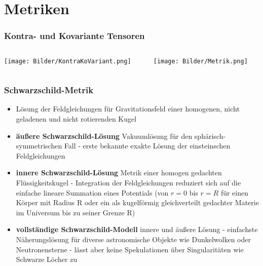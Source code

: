 \documentclass{beamer}
\begin{document}
\section{Metriken}

\begin{frame}\frametitle{Kontra- und Kovariante Tensoren}

\begin{columns}

\begin{column}{.48\textwidth}

\texttt{[image: Bilder/KontraKoVariant.png]}

\end{column}

\hfill

\begin{column}{.48\textwidth}

\texttt{[image: Bilder/Metrik.png]}

\end{column}

\end{columns}

\end{frame}

\begin{frame}\frametitle{Schwarzschild-Metrik}

\begin{itemize}

\item Lösung der Feldgleichungen für Gravitationsfeld einer homogenen, nicht geladenen und nicht rotierenden Kugel

\item \textbf{äußere Schwarzschild-Lösung} Vakuumlösung für den sphärisch-symmetrischen Fall - erste bekannte exakte Lösung der einsteinschen Feldgleichungen

\item \textbf{innere Schwarzschild-Lösung} Metrik einer homogen gedachten Flüssigkeitskugel - Integration der Feldgleichungen reduziert sich auf die einfache lineare Summation eines Potentials (von $r=0$ bis $r=R$ für einen Körper mit Radius R oder ein als kugelförmig gleichverteilt gedachter Materie im Universum bis zu seiner Grenze R)

\item \textbf{vollständige Schwarzschild-Modell} innere und äußere Lösung - einfachste Näherungslösung für diverse astronomische Objekte wie Dunkelwolken oder Neutronensterne - lässt aber keine Spekulationen über Singularitäten wie Schwarze Löcher zu
\end{itemize}

\end{frame}
\end{document}
